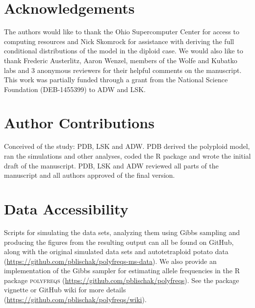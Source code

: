 \documentclass[11pt,english,letterpaper,oneside]{article}
\begin{document}
\section{Acknowledgements}           %

The authors would like to thank the Ohio Supercomputer Center for access to computing resources and Nick Skomrock for assistance with deriving the full conditional distributions of the model in the diploid case. We would also like to thank Frederic Austerlitz, Aaron Wenzel, members of the Wolfe and Kubatko labs and 3 anonymous reviewers for their helpful comments on the manuscript. This work was partially funded through a grant from the National Science Foundation (DEB-1455399) to ADW and LSK.
\medskip



\singlespacing




\doublespacing

\section{Author Contributions}        %

Conceived of the study: PDB, LSK and ADW. PDB derived the polyploid model, ran the simulations and other analyses, coded the R package and wrote the initial draft of the manuscript. PDB, LSK and ADW reviewed all parts of the manuscript and all authors approved of the final version.
\medskip

\section{Data Accessibility}            %

Scripts for simulating the data sets, analyzing them using Gibbs sampling and producing the figures from the resulting output can all be found on GitHub, along with the original simulated data sets and autotetraploid potato data (\url{https://github.com/pblischak/polyfreqs-ms-data}). We also provide an implementation of the Gibbs sampler for estimating allele frequencies in the R package \textsc{polyfreqs} (\url{https://github.com/pblischak/polyfreqs}). See the package vignette or GitHub wiki for more details (\url{https://github.com/pblischak/polyfreqs/wiki}).
\end{document}
